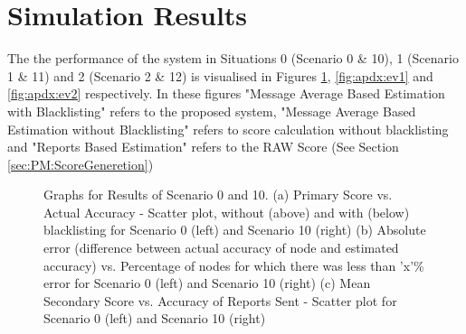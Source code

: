 \documentclass[journal]{IEEEtran}
\begin{document}
\section{Simulation Results}
\label{apdx:simResults}

The the performance of the system in Situations 0 (Scenario 0 \& 10), 1 (Scenario 1 \& 11) and 2 (Scenario 2 \& 12) is visualised in Figures  \ref{fig:apdx:ev0}, \ref{fig:apdx:ev1} and \ref{fig:apdx:ev2} respectively.
In these figures "Message Average Based Estimation with Blacklisting" refers to the proposed system, "Message Average Based Estimation without Blacklisting" refers to score calculation without blacklisting and "Reports Based Estimation" refers to the RAW Score (See Section \ref{sec:PM:ScoreGeneretion})
\begin{figure}[!ht]
	\caption{Graphs for Results of Scenario 0 and 10. (a) Primary Score vs. Actual Accuracy - Scatter plot, without (above) and with (below) blacklisting for Scenario 0 (left) and Scenario 10 (right) (b) Absolute error (difference between actual accuracy of node and estimated accuracy) vs. Percentage of nodes for which there was less than 'x'\% error for Scenario 0 (left) and Scenario 10 (right) (c) Mean Secondary Score vs. Accuracy of Reports Sent - Scatter plot for Scenario 0 (left) and Scenario 10 (right)}
	\label{fig:apdx:ev0}
	\centering
\end{figure}
\end{document}
